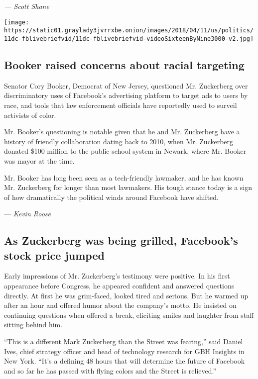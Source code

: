 \emph{--- Scott Shane}

\texttt{[image: https://static01.graylady3jvrrxbe.onion/images/2018/04/11/us/politics/11dc-fblivebriefvid/11dc-fblivebriefvid-videoSixteenByNine3000-v2.jpg]}

\hypertarget{booker-raised-concerns-about-racial-targeting}{%
\subsection{Booker raised concerns about racial
targeting}\label{booker-raised-concerns-about-racial-targeting}}

Senator Cory Booker, Democrat of New Jersey, questioned Mr. Zuckerberg
over discriminatory uses of Facebook's advertising platform to target
ads to users by race, and tools that law enforcement officials have
reportedly used to surveil activists of color.

Mr. Booker's questioning is notable given that he and Mr. Zuckerberg
have a history of friendly collaboration dating back to 2010, when Mr.
Zuckerberg donated \$100 million to the public school system in Newark,
where Mr. Booker was mayor at the time.

Mr. Booker has long been seen as a tech-friendly lawmaker, and he has
known Mr. Zuckerberg for longer than most lawmakers. His tough stance
today is a sign of how dramatically the political winds around Facebook
have shifted.

--- \emph{Kevin Roose}

\hypertarget{as-zuckerberg-was-being-grilled-facebooks-stock-price-jumped}{%
\subsection{As Zuckerberg was being grilled, Facebook's stock price
jumped}\label{as-zuckerberg-was-being-grilled-facebooks-stock-price-jumped}}

Early impressions of Mr. Zuckerberg's testimony were positive. In his
first appearance before Congress, he appeared confident and answered
questions directly. At first he was grim-faced, looked tired and
serious. But he warmed up after an hour and offered humor about the
company's motto. He insisted on continuing questions when offered a
break, eliciting smiles and laughter from staff sitting behind him.

``This is a different Mark Zuckerberg than the Street was fearing,''
said Daniel Ives, chief strategy officer and head of technology research
for GBH Insights in New York. ``It's a defining 48 hours that will
determine the future of Facebook and so far he has passed with flying
colors and the Street is relieved.''

